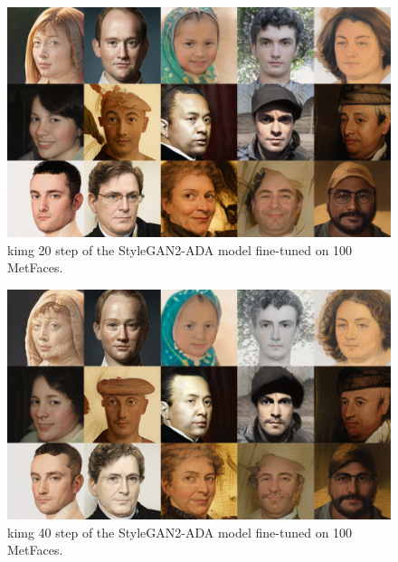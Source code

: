\documentclass[conference]{IEEEtran}
\begin{document}
\begin{figure}[!h]
	\begin{center}
		\includegraphics[width=0.8\columnwidth]{./images/picked_images/stylegan2_ADA_step_20_subset100_dataset.png}
		\caption{kimg 20 step of the StyleGAN2-ADA model fine-tuned on 100 MetFaces.}
		\label{fig:figure12}
	\end{center}
\end{figure}

\begin{figure}[!h]
	\begin{center}
		\includegraphics[width=0.8\columnwidth]{./images/picked_images/stylegan2_ADA_step_40_subset100_dataset.png}
		\caption{kimg 40 step of the StyleGAN2-ADA model fine-tuned on 100 MetFaces.}
		\label{fig:figure13}
	\end{center}
\end{figure}
\end{document}
